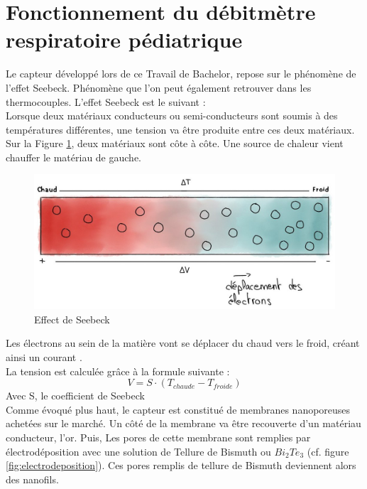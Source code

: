 \section{Fonctionnement du débitmètre respiratoire pédiatrique}
Le capteur développé lors de ce Travail de Bachelor, repose sur le phénomène de l'effet Seebeck. Phénomène que l'on peut également retrouver 
dans les thermocouples. L'effet Seebeck est le suivant :\\
Lorsque deux matériaux conducteurs ou semi-conducteurs sont soumis à des températures différentes, une tension va être produite entre ces deux matériaux. \\
Sur la Figure \ref{fig:Seebeck}, deux matériaux sont côte à côte. Une source de chaleur vient chauffer le matériau de gauche. 
\begin{figure}[H]
    \centering
    \includegraphics[scale = 0.3]{images/Seebeck.jpg}
    \caption{Effect de Seebeck}
    \label{fig:Seebeck}
\end{figure}
Les électrons au sein de la matière vont se déplacer du chaud vers le froid, créant ainsi un courant \cite{instrumentys_effet_2021}.\\
La tension est calculée grâce à la formule suivante :
\[V = S \cdot (T_{chaude} - T_{froide})\]
Avec S, le coefficient de Seebeck\\
Comme évoqué plus haut, le capteur est constitué de membranes nanoporeuses achetées sur le marché. 
Un côté de la membrane va être recouverte d'un matériau conducteur, l'or. Puis, Les pores de cette membrane sont remplies par 
électrodéposition avec une solution de Tellure de Bismuth ou $Bi_2Te_3$ (cf. figure \ref{fig:electrodeposition}). Ces pores remplis de tellure de 
Bismuth deviennent alors des nanofils. 
